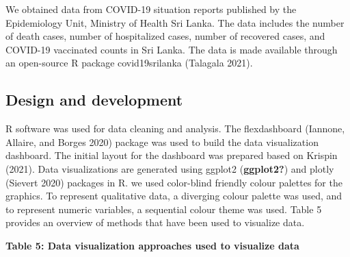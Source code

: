 \documentclass[
]{article}
\begin{document}
We obtained data from COVID-19 situation reports published by the
Epidemiology Unit, Ministry of Health Sri Lanka. The data includes the
number of death cases, number of hospitalized cases, number of recovered
cases, and COVID-19 vaccinated counts in Sri Lanka. The data is made
available through an open-source R package covid19srilanka (Talagala
2021).

\hypertarget{design-and-development}{%
\subsection{Design and development}\label{design-and-development}}

R software was used for data cleaning and analysis. The flexdashboard
(Iannone, Allaire, and Borges 2020) package was used to build the data
visualization dashboard. The initial layout for the dashboard was
prepared based on Krispin (2021). Data visualizations are generated
using ggplot2 (\textbf{ggplot2?}) and plotly (Sievert 2020) packages in
R. we used color-blind friendly colour palettes for the graphics. To
represent qualitative data, a diverging colour palette was used, and to
represent numeric variables, a sequential colour theme was used. Table 5
provides an overview of methods that have been used to visualize data.

\textbf{Table 5: Data visualization approaches used to visualize data}
\end{document}
